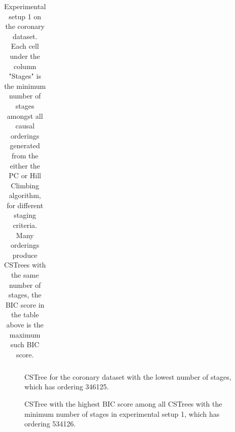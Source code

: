 \documentclass{tufte-book}
\begin{document}
\begin{table}[]
\begin{tabular}{cccccccccccccccc}
\caption{Experimental setup 1 on the coronary dataset. Each cell under the column "Stages" is the minimum number of stages amongst all causal orderings generated from the either the PC or Hill Climbing algorithm, for different staging criteria. Many orderings produce CSTrees with the same number of stages, the BIC score in the table above is the maximum such BIC score.}
\end{tabular}
\end{table}

\begin{figure}[]\label{fig:coronary1}
   \begin{floatrow}
%
\caption{CSTree for the coronary dataset with the lowest number of stages, which has ordering 346125.}
        
   \end{floatrow}
\end{figure}

\begin{figure}[]\label{fig:coronary2}
   \begin{floatrow}
%
\caption{CSTree with the highest BIC score among all CSTrees with the minimum number of stages in experimental setup 1, which has ordering 534126.}
        
   \end{floatrow}
\end{figure}
\end{document}
